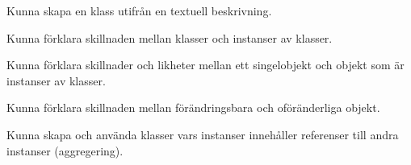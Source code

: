 

\item Kunna skapa en klass utifrån en textuell beskrivning. %
\item Kunna förklara skillnaden mellan klasser och instanser av klasser.
\item Kunna förklara skillnader och likheter mellan ett singelobjekt och objekt som är instanser av klasser.
\item Kunna förklara skillnaden mellan förändringsbara och oföränderliga objekt.
\item Kunna skapa och använda klasser vars instanser innehåller referenser till andra instanser (aggregering).

